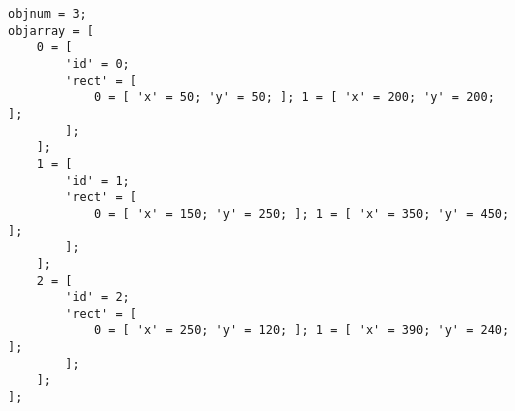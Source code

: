 \begin{verbatim}
objnum = 3;
objarray = [
    0 = [
        'id' = 0;
        'rect' = [
            0 = [ 'x' = 50; 'y' = 50; ]; 1 = [ 'x' = 200; 'y' = 200; ];
        ];
    ];
    1 = [
        'id' = 1;
        'rect' = [
            0 = [ 'x' = 150; 'y' = 250; ]; 1 = [ 'x' = 350; 'y' = 450; ];
        ];
    ];
    2 = [
        'id' = 2;
        'rect' = [
            0 = [ 'x' = 250; 'y' = 120; ]; 1 = [ 'x' = 390; 'y' = 240; ];
        ];
    ];
];
\end{verbatim}
